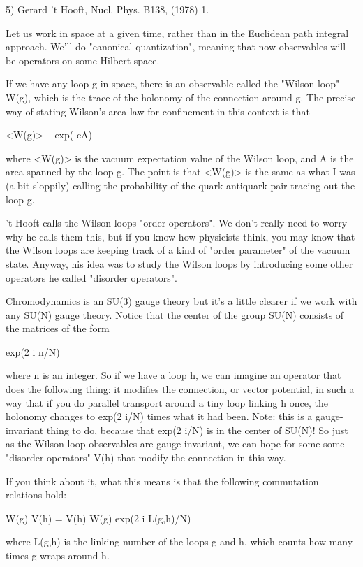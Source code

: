 5) Gerard 't Hooft, Nucl. Phys. B138, (1978) 1.

Let us work in space at a given time, rather than in the Euclidean
path integral approach.  We'll do "canonical quantization", meaning that
now observables will be operators on some Hilbert space.  

If we have any loop g in space, there is an observable called the
"Wilson loop" W(g), which is the trace of the holonomy of the
connection around g.  The precise way of stating Wilson's area law for
confinement in this context is that 

<W(g)> ~ exp(-cA)

where <W(g)> is the vacuum expectation value of the Wilson loop, and
A is the area spanned by the loop g.  The point is that <W(g)> is
the same as what I was (a bit sloppily) calling the probability of the
quark-antiquark pair tracing out the loop g.  

't Hooft calls the Wilson loops "order operators".  We don't really
need to worry why he calls them this, but if you know how physicists
think, you may know that the Wilson loops are keeping track of a kind
of "order parameter" of the vacuum state.  Anyway, his idea was to
study the Wilson loops by introducing some other operators he called
"disorder operators".

Chromodynamics is an SU(3) gauge theory but it's a little clearer if
we work with any SU(N) gauge theory.  Notice that the center of the
group SU(N) consists of the matrices of the form 

exp(2 \pi  i n/N)

where n is an integer.  So if we have a loop h, we can imagine an
operator that does the following thing: it modifies the connection, or
vector potential, in such a way that if you do parallel transport
around a tiny loop linking h once, the holonomy changes to exp(2 \pi  i/N)
times what it had been.  Note: this is a gauge-invariant thing to do,
because that exp(2 \pi  i/N) is in the center of SU(N)!  So just as the
Wilson loop observables are gauge-invariant, we can hope for some some
"disorder operators" V(h) that modify the connection in this way.

If you think about it, what this means is that the following
commutation relations hold:

W(g) V(h) = V(h) W(g) exp(2 \pi  i L(g,h)/N)

where L(g,h) is the linking number of the loops g and h, which counts
how many times g wraps around h.  

